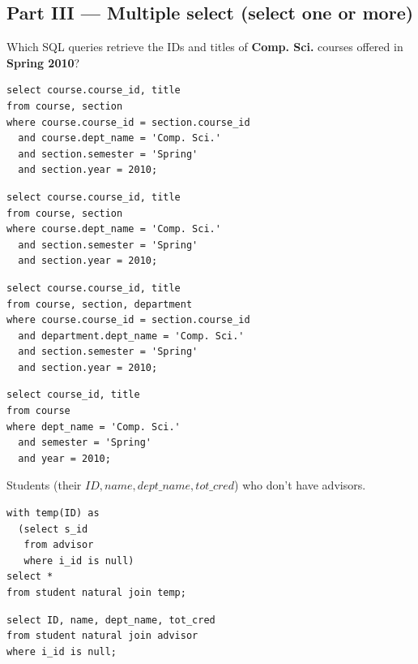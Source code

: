\documentclass[12pt]{exam}
\begin{document}
\begin{questions}
\section*{Part III — Multiple select (select one or more)}
\question[4] Which SQL queries retrieve the IDs and titles of \textbf{Comp. Sci.} courses offered in \textbf{Spring 2010}?
\begin{choices}

  \CorrectChoice
\begin{verbatim}
select course.course_id, title
from course, section
where course.course_id = section.course_id
  and course.dept_name = 'Comp. Sci.'
  and section.semester = 'Spring'
  and section.year = 2010;
\end{verbatim}

  \choice
\begin{verbatim}
select course.course_id, title
from course, section
where course.dept_name = 'Comp. Sci.'
  and section.semester = 'Spring'
  and section.year = 2010;
\end{verbatim}

  \choice
\begin{verbatim}
select course.course_id, title
from course, section, department
where course.course_id = section.course_id
  and department.dept_name = 'Comp. Sci.'
  and section.semester = 'Spring'
  and section.year = 2010;
\end{verbatim}

  \choice
\begin{verbatim}
select course_id, title
from course
where dept_name = 'Comp. Sci.'
  and semester = 'Spring'
  and year = 2010;
\end{verbatim}

\end{choices}

\question[5] Students (their \(\mathit{ID}, \mathit{name}, \mathit{dept\_name}, \mathit{tot\_cred}\)) who don't have advisors.
\begin{choices}

  \choice
\begin{verbatim}
with temp(ID) as
  (select s_id
   from advisor
   where i_id is null)
select *
from student natural join temp;
\end{verbatim}

  \choice
\begin{verbatim}
select ID, name, dept_name, tot_cred
from student natural join advisor
where i_id is null;
\end{verbatim}


\end{choices}
\end{questions}
\end{document}
